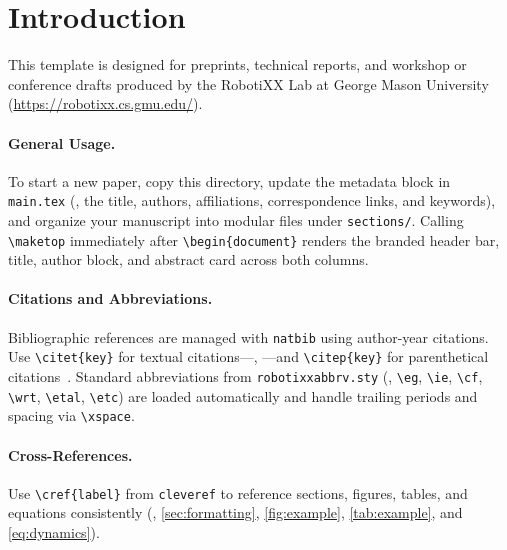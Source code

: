 \section{Introduction}
\label{sec:intro}

This template is designed for preprints, technical reports, and workshop or conference drafts produced by the RobotiXX Lab at George Mason University (\url{https://robotixx.cs.gmu.edu/}).

\paragraph{General Usage.}
To start a new paper, copy this directory, update the metadata block in \texttt{main.tex} (\ie, the title, authors, affiliations, correspondence links, and keywords), and organize your manuscript into modular files under \texttt{sections/}. Calling \texttt{\textbackslash maketop} immediately after \texttt{\textbackslash begin\{document\}} renders the branded header bar, title, author block, and abstract card across both columns.

\paragraph{Citations and Abbreviations.}
Bibliographic references are managed with \texttt{natbib} using author-year citations. Use \texttt{\textbackslash citet\{key\}} for textual citations---\eg, \citet{xiao2022motion}---and \texttt{\textbackslash citep\{key\}} for parenthetical citations~\citep{vaswani2017attention,lynch2017modern}. Standard abbreviations from \texttt{robotixxabbrv.sty} (\eg, \texttt{\textbackslash eg}, \texttt{\textbackslash ie}, \texttt{\textbackslash cf}, \texttt{\textbackslash wrt}, \texttt{\textbackslash etal}, \texttt{\textbackslash etc}) are loaded automatically and handle trailing periods and spacing via \texttt{\textbackslash xspace}.

\paragraph{Cross-References.}
Use \texttt{\textbackslash cref\{label\}} from \texttt{cleveref} to reference sections, figures, tables, and equations consistently (\eg, \cref{sec:formatting}, \cref{fig:example}, \cref{tab:example}, and \cref{eq:dynamics}).
